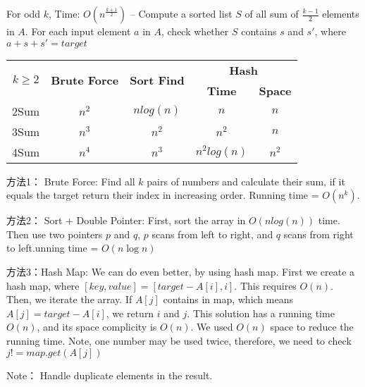 For odd $k$, Time: $O(n^{\frac{k+1}{2}})$ --
Compute a sorted list $S$ of all sum of $\frac{k-1}{2}$ elements in $A$. For each input element $a$ in $A$, check whether $S$ contains $s$ and $s′$, where $a+s+s′=target$

\begin{center}
	\begin{tabular}{|c|c|c|c|c|}
		\hline
		\multirow{2}{*}{\textbf{$k≥2$}} & \multirow{2}{*}{\textbf{Brute Force}} & \multirow{2}{*}{\textbf{Sort Find}} & \multicolumn{2}{|c|}{\textbf{Hash}} \\
		\cline{4-5} & & & \textbf{Time} & \textbf{Space}\\
		\hline
		2Sum & $n^2$ & $nlog(n)$ & $n$ & $n$ \\
		\hline
		3Sum & $n^3$ & $n^2$ & $n^2$ & $n$ \\
		\hline
		4Sum & $n^4$ & $n^3$ & $n^2log(n)$ & $n^2$ \\
		\hline
	\end{tabular}
\end{center}



方法1： Brute Force: Find all $k$ pairs of numbers and calculate their sum, if it equals the target return their index in increasing order. Running time = $O(n^k)$.

方法2： Sort + Double Pointer: First, sort the array in $O(nlog(n))$ time. Then use two pointers $p$ and $q$, $p$ scans from left to right, and $q$ scans from right to left.unning 
time = 
$O(n\log n)$

方法3：Hash Map: We can do even better, by using hash map. First we create a hash map, where
$[key, value] = [target - A[i], i]$.
This requires $O(n)$. Then, we iterate the array. If $A[j]$ contains in map, which means $A[j] = target - A[i]$, we return $i$ and $j$. This solution has a running time $O(n)$, 
and its space 
complicity is $O(n)$. We used $O(n)$ space to reduce the running time.
Note, one number may be used twice, therefore, we need to check $j != map.get(A[j])$

Note： Handle duplicate elements in the result.

